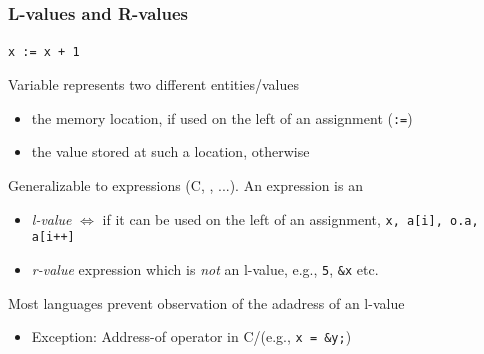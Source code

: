 \documentclass{beamer}
\newcommand{\Blue}[1]{\color{blue}#1\color{black}}
\begin{document}
\begin{frame}[fragile]
\frametitle{L-values and R-values}
\framesubtitle{}

\begin{center}
\texttt{\Blue{x}\ :=\ \color{red}x\color{black}\ + 1}
\end{center}

\pause\medskip

Variable represents two different entities/values 
\begin{itemize} 
\item the \Blue{memory location}, if used on the left of an assignment (\texttt{:=})
\item the \color{red}value stored at such a location\color{black}, otherwise
\end{itemize}

\pause\medskip


Generalizable to expressions (C, \cpp, ...). An expression is an
\begin{itemize}
\item \emph{l-value} $\Leftrightarrow$ if it can be used on the left of an assignment,
\texttt{x, a[i], o.a, a[i++]}
\item \emph{r-value} expression which is \emph{not} an l-value, e.g.,
  \texttt{5}, \texttt{\&x} etc.
\end{itemize}

\pause\medskip
Most languages prevent observation of the adadress of an l-value
\begin{itemize}
\item Exception: Address-of operator in C/\cpp (e.g., \texttt{x = \&y;})
\end{itemize}


\end{frame}
\end{document}
